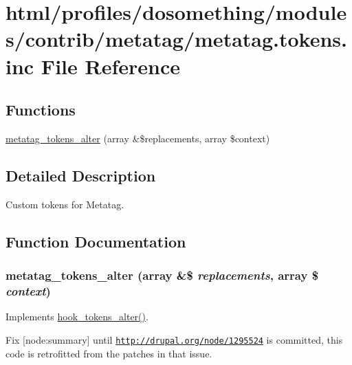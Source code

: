 \hypertarget{metatag_8tokens_8inc}{
\section{html/profiles/dosomething/modules/contrib/metatag/metatag.tokens.inc File Reference}
\label{metatag_8tokens_8inc}
}
\subsection*{Functions}
\begin{DoxyCompactItemize}
\item 
\hyperlink{metatag_8tokens_8inc_aa5a2a1311323a65037cca7e949e7c899}{metatag\_\-tokens\_\-alter} (array \&\$replacements, array \$context)
\end{DoxyCompactItemize}


\subsection{Detailed Description}
Custom tokens for Metatag. 

\subsection{Function Documentation}
\hypertarget{metatag_8tokens_8inc_aa5a2a1311323a65037cca7e949e7c899}{
\subsubsection[{metatag\_\-tokens\_\-alter}]{\setlength{\rightskip}{0pt plus 5cm}metatag\_\-tokens\_\-alter (array \&\$ {\em replacements}, \/  array \$ {\em context})}}
\label{metatag_8tokens_8inc_aa5a2a1311323a65037cca7e949e7c899}
Implements \hyperlink{group__hooks_gaeeea438e74b29e5603f0ed3f1967a257}{hook\_\-tokens\_\-alter()}.

Fix \mbox{[}node:summary\mbox{]} until \href{http://drupal.org/node/1295524}{\tt http://drupal.org/node/1295524} is committed, this code is retrofitted from the patches in that issue. 